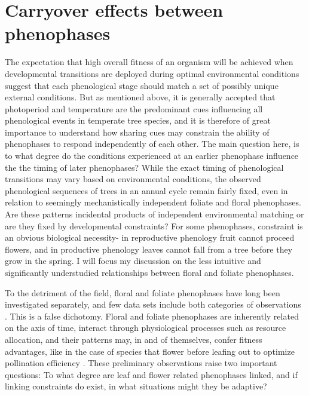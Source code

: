 \documentclass{article}\usepackage[]{graphicx}\usepackage[]{color}
\begin{document}
\section{Carryover effects between phenophases}
\par The expectation that high overall fitness of an organism will be achieved when developmental transitions are deployed during optimal environmental conditions suggest that each phenological stage should match a set of possibly unique external conditions. But as mentioned above, it is generally accepted that photoperiod and temperature are the predominant cues influencing all phenological events in temperate tree species, and it is therefore of great importance to understand how sharing cues may constrain the ability of phenophases to respond independently of each other. The main question here, is to what degree do the conditions experienced at an earlier phenophase influence the the timing of later phenophases? While the exact timing of phenological transitions may vary based on environmental conditions, the observed phenological sequences of trees in an annual cycle remain fairly fixed, even in relation to seemingly mechanistically independent foliate and floral phenophases. Are these patterns incidental products of independent environmental matching or are they fixed by developmental constraints? For some phenophases, constraint is an obvious biological necessity- in reproductive phenology fruit cannot proceed flowers, and in productive phenology leaves cannot fall from a tree before they grow in the spring. I will focus my discussion on the less intuitive and significantly understudied relationships between floral and foliate phenophases.
\par To the detriment of the field, floral and foliate phenophases have long been investigated separately, and few data sets include both categories of observations \citep{Wolkovich2014}. This is a false dichotomy. Floral and foliate phenophases are inherently related on the axis of time, interact through physiological processes such as resource allocation, and their patterns may, in and of themselves, confer fitness advantages, like in the case of species that flower before leafing out to optimize pollination efficiency \citep{Whitehead1969}. These preliminary observations raise two important questions: To what degree are leaf and flower related phenophases linked, and if linking constraints do exist, in what situations might they be adaptive?
\end{document}
